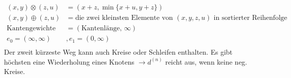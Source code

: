 \begin{align*}
(x,y) \otimes (z,u) &= (x+z, \min\{x+u, y+z\}) \\
(x,y) \oplus (z,u) &= \text{die zwei kleinsten Elemente von } (x,y,z,u) \text{ in sortierter Reihenfolge}\\
\text{Kantengewichte } &= (\text{Kantenlänge, }\infty)\\
e_0 = (\infty, \infty)&, e_1 = (0, \infty)\\  
\end{align*}
Der zweit kürzeste Weg kann auch Kreise oder Schleifen enthalten. Es gibt höchsten eine Wiederholung eines Knotens $\rightarrow d^(n)$ reicht aus, wenn keine neg. Kreise.\\

 